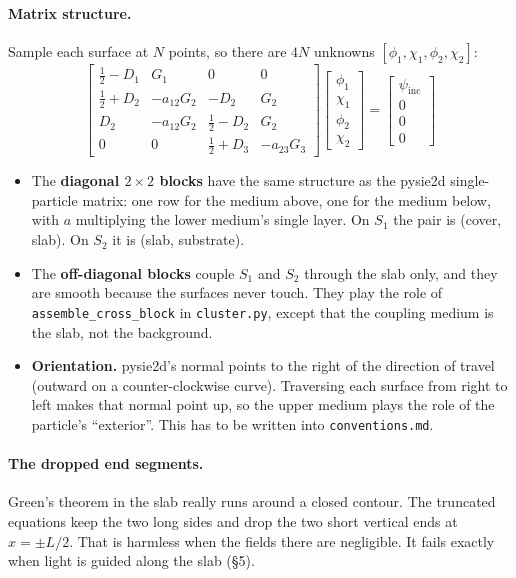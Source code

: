 \documentclass[11pt,a4paper]{article}
\newcommand{\inc}{\mathrm{inc}}
\begin{document}
\paragraph{Matrix structure.} Sample each surface at $N$ points, so there are $4N$
unknowns $[\phi_1,\chi_1,\phi_2,\chi_2]$:
\[
\left[\begin{array}{cc|cc}
 \tfrac12 - D_1 & G_1 & 0 & 0\\
 \tfrac12 + D_2 & -a_{12}G_2 & -D_2 & G_2\\ \hline
 D_2 & -a_{12}G_2 & \tfrac12 - D_2 & G_2\\
 0 & 0 & \tfrac12 + D_3 & -a_{23}G_3
\end{array}\right]
\left[\begin{array}{c}\phi_1\\ \chi_1\\ \hline \phi_2\\ \chi_2\end{array}\right]
=
\left[\begin{array}{c}\psi_\inc\\ 0\\ \hline 0\\ 0\end{array}\right]
\]
\begin{itemize}
  \item The \textbf{diagonal $2\times2$ blocks} have the same structure as the
        pysie2d single-particle matrix: one row for the medium above, one for the
        medium below, with $a$ multiplying the lower medium's single layer.
        On $S_1$ the pair is (cover, slab). On $S_2$ it is (slab, substrate).
  \item The \textbf{off-diagonal blocks} couple $S_1$ and $S_2$ through the slab
        only, and they are smooth because the surfaces never touch. They play the
        role of \texttt{assemble\_cross\_block} in \texttt{cluster.py}, except that
        the coupling medium is the slab, not the background.
  \item \textbf{Orientation.} pysie2d's normal points to the right of the direction of travel
        (outward on a counter-clockwise curve). Traversing each surface from
        right to left makes that normal point up, so the upper medium plays the
        role of the particle's ``exterior''. This has to be written into
        \texttt{conventions.md}.
\end{itemize}

\paragraph{The dropped end segments.} Green's theorem in the slab really runs
around a closed contour. The truncated equations keep the two long sides and drop
the two short vertical ends at $x=\pm L/2$. That is harmless when the fields there are
negligible. It fails exactly when light is guided along the slab (\S5).
\end{document}
